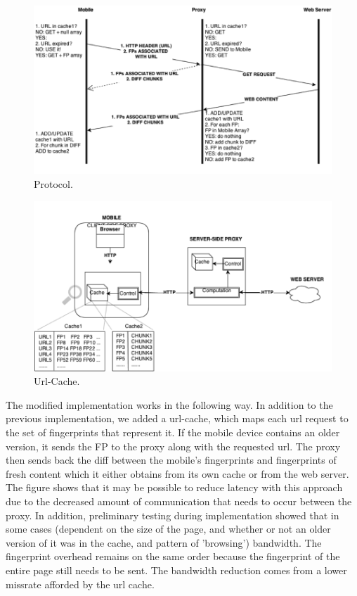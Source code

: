 \begin{figure}[h] 
\centering \includegraphics[scale=0.40]{images/urlcache-protocol.png}
\caption{Protocol. }
\end{figure} 

\begin{figure}[h] 
\centering \includegraphics[scale=0.40]{images/url-cache-hl.png}
\caption{Url-Cache. }
\end{figure} 

The modified implementation works in the following way. In addition to the previous implementation, we added a url-cache, which maps each url request to the set of fingerprints that represent it. If the mobile device contains an older version, it sends the FP to the proxy along with the requested url. The proxy then sends back the diff between the mobile's fingerprints and fingerprints of fresh content which it either obtains from its own cache or from the web server. \\

The figure shows that it may be possible to reduce latency with this approach due to the decreased amount of communication that needs to occur between the proxy. In addition, preliminary testing during implementation showed that in some cases (dependent on the size of the page, and whether or not an older version of it was in the cache, and pattern of 'browsing') bandwidth. The fingerprint overhead remains on the same order because the fingerprint of the entire page still needs to be sent. The bandwidth reduction comes from a lower missrate afforded by the url cache.  \\

